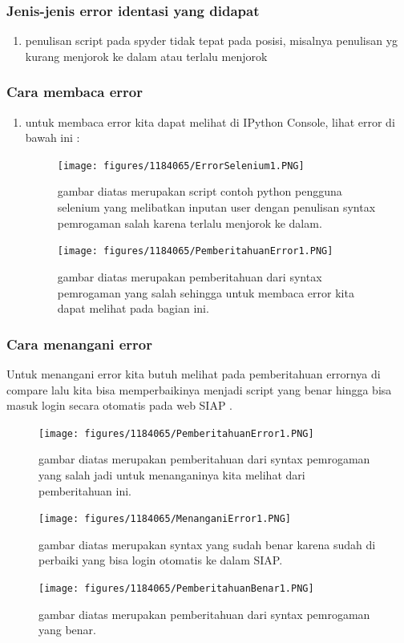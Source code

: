 \subsubsection{Jenis-jenis error identasi yang didapat}
\begin{enumerate}
	\item penulisan script pada spyder tidak tepat pada posisi, misalnya penulisan yg kurang menjorok ke dalam atau terlalu menjorok
\end{enumerate}
\subsubsection{Cara membaca error}
\begin{enumerate}
	\item untuk membaca error kita dapat melihat di IPython Console, lihat error di bawah ini :
	\begin{figure}[H]
		\texttt{[image: figures/1184065/ErrorSelenium1.PNG]}
		\centering
		\caption{gambar diatas merupakan script contoh python pengguna selenium yang melibatkan inputan user dengan penulisan syntax pemrogaman salah karena terlalu menjorok ke dalam.}
	\end{figure}
	\begin{figure}[H]
		\texttt{[image: figures/1184065/PemberitahuanError1.PNG]}
		\centering
		\caption{gambar diatas merupakan pemberitahuan dari syntax pemrogaman yang salah sehingga untuk membaca error kita dapat melihat pada bagian ini.}
		\end{figure}
\end{enumerate}
\subsubsection{Cara menangani error}
Untuk menangani error kita butuh melihat pada pemberitahuan errornya di compare lalu kita bisa memperbaikinya menjadi script yang benar hingga bisa masuk login secara otomatis pada web SIAP .
\begin{figure}[H]
		\texttt{[image: figures/1184065/PemberitahuanError1.PNG]}
		\centering
		\caption{gambar diatas merupakan pemberitahuan dari syntax pemrogaman yang salah jadi untuk menanganinya kita melihat dari pemberitahuan ini.}
		\end{figure}
		\begin{figure}[H]
		\texttt{[image: figures/1184065/MenanganiError1.PNG]}
		\centering
		\caption{gambar diatas merupakan syntax yang sudah benar karena sudah di perbaiki yang bisa login otomatis ke dalam SIAP.}
		\end{figure}
		\begin{figure}[H]
		\texttt{[image: figures/1184065/PemberitahuanBenar1.PNG]}
		\centering
		\caption{gambar diatas merupakan pemberitahuan dari syntax pemrogaman yang benar.}
		\end{figure}






	
